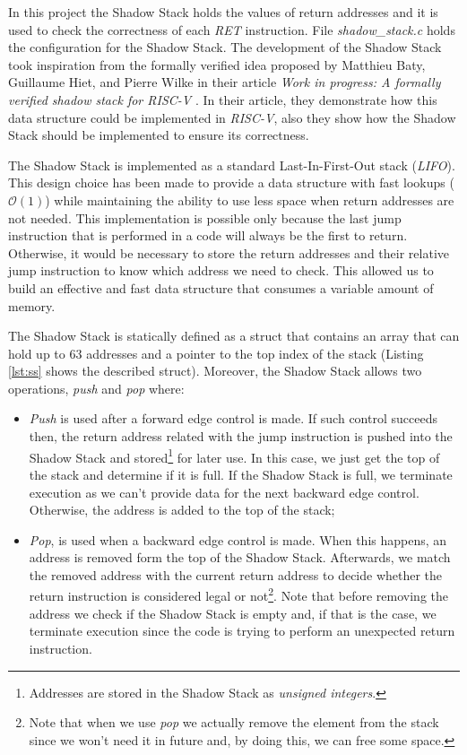 In this project the Shadow Stack holds the values of return addresses and it is
used to check the correctness of each \textit{RET} instruction. File \textit{shadow\_stack.c}
holds the configuration for the Shadow Stack. The development of the Shadow
Stack took inspiration from the formally verified idea proposed by Matthieu Baty,
Guillaume Hiet, and Pierre Wilke in their article \textit{Work in progress: A formally
verified shadow stack for RISC-V} \cite{shadowstack}. In their article, they demonstrate
how this data structure could be implemented in \textit{RISC-V}, also they show how
the Shadow Stack should be implemented to ensure its correctness.

The Shadow Stack is implemented as a standard Last-In-First-Out stack (\textit{LIFO}).
This design choice has been made to provide a data structure with fast lookups ($\mathcal{O}
(1)$) while maintaining the ability to use less space when return addresses are not
needed. This implementation is possible only because the last jump instruction
that is performed in a code will always be the first to return. Otherwise, it
would be necessary to store the return addresses and their relative jump
instruction to know which address we need to check. This allowed us to build an effective
and fast data structure that consumes a variable amount of memory.

The Shadow Stack is statically defined as a struct that contains an array that can
hold up to $63$ addresses and a pointer to the top index of the stack (Listing
\ref{lst:ss} shows the described struct). Moreover, the Shadow Stack allows two operations,
\textit{push} and \textit{pop} where:
\begin{itemize}
  \item \textit{Push} is used after a forward edge control is made. If such control
    succeeds then, the return address related with the jump instruction is
    pushed into the Shadow Stack and stored\footnote{Addresses are stored in the
    Shadow Stack as \textit{unsigned integers}.} for later use. In this case, we
    just get the top of the stack and determine if it is full. If the Shadow
    Stack is full, we terminate execution as we can't provide data for the next backward
    edge control. Otherwise, the address is added to the top of the stack;

  \item \textit{Pop}, is used when a backward edge control is made. When this
    happens, an address is removed form the top of the Shadow Stack. Afterwards,
    we match the removed address with the current return address to decide whether
    the return instruction is considered legal or not\footnote{Note that when we
    use \textit{pop} we actually remove the element from the stack since we won't
    need it in future and, by doing this, we can free some space.}. Note that before
    removing the address we check if the Shadow Stack is empty and, if that is
    the case, we terminate execution since the code is trying to perform an unexpected
    return instruction.
\end{itemize}

